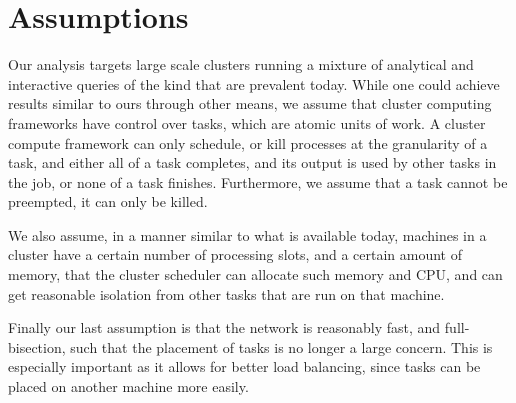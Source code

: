 \section{Assumptions}
Our analysis targets large scale clusters running a mixture of analytical and interactive queries of the kind that are
prevalent today. While one could achieve results similar to ours through other means, we assume that cluster computing
frameworks have control over tasks, which are atomic units of work. A cluster compute framework can only schedule, or
kill processes at the granularity of a task, and either all of a task completes, and its output is used by other tasks
in the job, or none of a task finishes. Furthermore, we assume that a task cannot be preempted, it can only be killed.

We also assume, in a manner similar to what is available today, machines in a cluster have a certain number of
processing slots, and a certain amount of memory, that the cluster scheduler can allocate such memory and CPU, and can
get reasonable isolation from other tasks that are run on that machine. 

Finally our last assumption is that the network is reasonably fast, and full-bisection, such that the placement of tasks
is no longer a large concern. This is especially important as it allows for better load balancing, since tasks can be
placed on another machine more easily.

